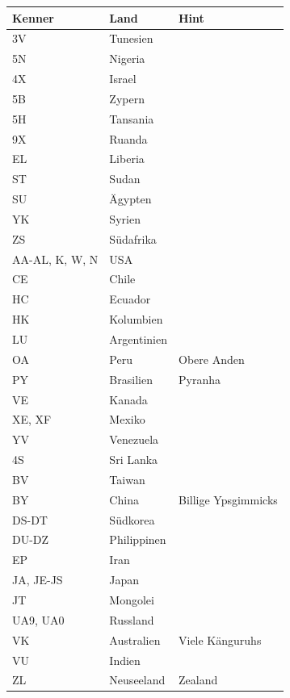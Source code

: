 \documentclass[11pt,BCOR=8.5mm]{scrartcl}
\begin{document}
  \begin{longtable}{| l | l | l |}
  \hline
  Kenner & Land & Hint \\
  \hline
  \hline
  \endhead
  3V & Tunesien & \\
  \hline
  5N & Nigeria & \\
  \hline
  4X & Israel & \\
  \hline
  5B & Zypern & \\
  \hline
  5H & Tansania & \\
  \hline
  9X & Ruanda & \\
  \hline
  EL & Liberia & \\
  \hline
  ST & Sudan & \\
  \hline
  SU & Ägypten & \\
  \hline
  YK & Syrien & \\
  \hline
  ZS & Südafrika & \\
  \hline
  \hline
  AA-AL, K, W, N & USA & \\
  \hline
  CE & Chile & \\
  \hline
  HC & Ecuador & \\
  \hline
  HK & Kolumbien & \\
  \hline
  LU & Argentinien & \\
  \hline
  OA & Peru & Obere Anden\\
  \hline
  PY & Brasilien & Pyranha\\
  \hline
  VE & Kanada & \\
  \hline
  XE, XF & Mexiko & \\
  \hline
  YV & Venezuela & \\
  \hline
  \hline
  4S & Sri Lanka & \\
  \hline
  BV & Taiwan & \\
  \hline
  BY & China & Billige Ypsgimmicks\\
  \hline
  DS-DT & Südkorea & \\
  \hline
  DU-DZ & Philippinen & \\
  \hline
  EP & Iran & \\
  \hline
  JA, JE-JS & Japan & \\
  \hline
  JT & Mongolei & \\
  \hline
  UA9, UA0 & Russland & \\
  \hline
  VK & Australien & Viele Känguruhs\\
  \hline
  VU & Indien & \\
  \hline
  ZL & Neuseeland & Zealand\\
  \hline
\end{longtable}
\end{document}
